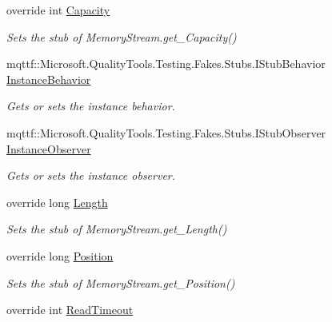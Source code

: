\begin{DoxyCompactItemize}
override int \hyperlink{class_system_1_1_i_o_1_1_fakes_1_1_stub_memory_stream_aee62f3d23d2702c7759150b915cfe225}{Capacity}
\begin{DoxyCompactList}\small\item\em Sets the stub of Memory\-Stream.\-get\-\_\-\-Capacity()\end{DoxyCompactList}\item 
mqttf\-::\-Microsoft.\-Quality\-Tools.\-Testing.\-Fakes.\-Stubs.\-I\-Stub\-Behavior \hyperlink{class_system_1_1_i_o_1_1_fakes_1_1_stub_memory_stream_a3c0fdc6b6e27afa0e0cf0e4cb9e9bbdb}{Instance\-Behavior}
\begin{DoxyCompactList}\small\item\em Gets or sets the instance behavior.\end{DoxyCompactList}\item 
mqttf\-::\-Microsoft.\-Quality\-Tools.\-Testing.\-Fakes.\-Stubs.\-I\-Stub\-Observer \hyperlink{class_system_1_1_i_o_1_1_fakes_1_1_stub_memory_stream_abfb08a3e21e756f89c34133f08bed392}{Instance\-Observer}
\begin{DoxyCompactList}\small\item\em Gets or sets the instance observer.\end{DoxyCompactList}\item 
override long \hyperlink{class_system_1_1_i_o_1_1_fakes_1_1_stub_memory_stream_afd220132666fb9e0633b5cd2d8fdc995}{Length}
\begin{DoxyCompactList}\small\item\em Sets the stub of Memory\-Stream.\-get\-\_\-\-Length()\end{DoxyCompactList}\item 
override long \hyperlink{class_system_1_1_i_o_1_1_fakes_1_1_stub_memory_stream_aa7e67c4cc12927ae84ad2d5550c10ab2}{Position}
\begin{DoxyCompactList}\small\item\em Sets the stub of Memory\-Stream.\-get\-\_\-\-Position()\end{DoxyCompactList}\item 
override int \hyperlink{class_system_1_1_i_o_1_1_fakes_1_1_stub_memory_stream_afdbda53fd5c02af1ab0627180fe4aa55}{Read\-Timeout}

\end{DoxyCompactItemize}
